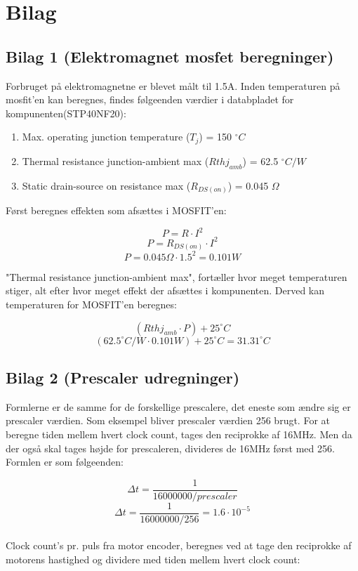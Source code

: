 \documentclass[11pt]{article}
\begin{document}
\section{Bilag}

\subsection{Bilag 1 (Elektromagnet mosfet beregninger)}
\label{subsec:mosfet}

Forbruget på elektromagnetne er blevet målt til 1.5A. Inden temperaturen på mosfit'en kan beregnes, findes følgeenden værdier i databpladet for kompunenten(STP40NF20):
\begin{enumerate}
\item Max. operating junction temperature ($T_j$) = 150 $^\circ C$
\item Thermal resistance junction-ambient max ($Rthj_{amb}$) = 62.5 $^\circ C/W$
\item Static drain-source on resistance max ($R_{DS(on)}$) = 0.045 $\Omega$
\end{enumerate}
Først beregnes effekten som afsættes i MOSFIT'en:

$$P = R \cdot I^2$$
$$P = R_{DS(on)} \cdot I^2$$
$$P = 0.045 \Omega \cdot 1.5^2 = 0.101 W$$

"Thermal resistance junction-ambient max", fortæller hvor meget temperaturen stiger, alt efter hvor meget effekt der afsættes i kompunenten. Derved kan temperaturen for MOSFIT'en beregnes:

$$(Rthj_{amb} \cdot P) + 25^\circ C$$
$$(62.5^\circ C/W  \cdot 0.101 W) + 25^\circ C = 31.31 ^\circ C$$



\newpage
\subsection{Bilag 2 (Prescaler udregninger)}
\label{subsec:prescaler_udregninger}
Formlerne er de samme for de forskellige prescalere, det eneste som ændre sig er prescaler værdien. Som eksempel bliver prescaler værdien 256 brugt. For at beregne tiden mellem hvert clock count, tages den reciprokke af 16MHz. Men da der også skal tages højde for prescaleren, divideres de 16MHz først med 256. Formlen er som følgeenden:

$$\Delta t = \frac{1}{16000000/prescaler}$$
$$\Delta t = \frac{1}{16000000/256} = 1.6 \cdot 10^{-5}$$\\

Clock count's pr. puls fra motor encoder, beregnes ved at tage den reciprokke af motorens hastighed og dividere med tiden mellem hvert clock count:
\end{document}
